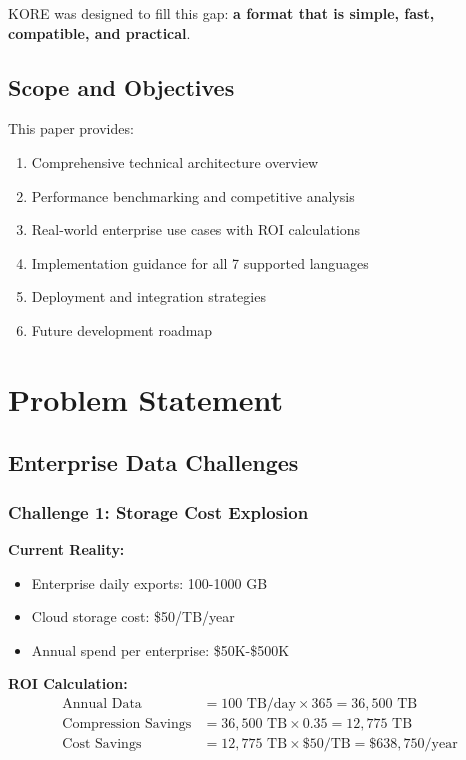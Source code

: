 \documentclass[12pt,a4paper]{report}
\begin{document}
KORE was designed to fill this gap: \textbf{a format that is simple, fast, compatible, and practical}.

\section{Scope and Objectives}

This paper provides:

\begin{enumerate}
    \item Comprehensive technical architecture overview
    \item Performance benchmarking and competitive analysis
    \item Real-world enterprise use cases with ROI calculations
    \item Implementation guidance for all 7 supported languages
    \item Deployment and integration strategies
    \item Future development roadmap
\end{enumerate}

\chapter{Problem Statement}

\section{Enterprise Data Challenges}

\subsection{Challenge 1: Storage Cost Explosion}

\textbf{Current Reality:}
\begin{itemize}
    \item Enterprise daily exports: 100-1000 GB
    \item Cloud storage cost: \$50/TB/year
    \item Annual spend per enterprise: \$50K-\$500K
\end{itemize}

\textbf{ROI Calculation:}
\begin{align}
\text{Annual Data} &= 100 \text{ TB/day} \times 365 = 36,500 \text{ TB} \\
\text{Compression Savings} &= 36,500 \text{ TB} \times 0.35 = 12,775 \text{ TB} \\
\text{Cost Savings} &= 12,775 \text{ TB} \times \$50/\text{TB} = \$638,750/\text{year}
\end{align}
\end{document}
